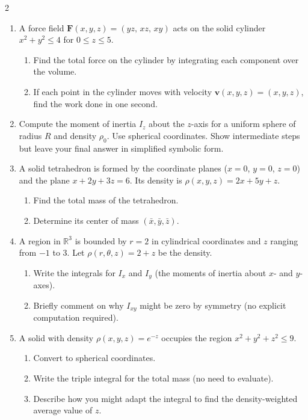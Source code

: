 \begin{multicols}{2}
\begin{enumerate}
\item 
A force field $\mathbf{F}(x,y,z) = (yz,\,xz,\,xy)$ acts on the solid cylinder $x^2+y^2 \le 4$ for $0 \le z \le 5$.  
\begin{enumerate}
   \item Find the total force on the cylinder by integrating each component over the volume.  
   \item If each point in the cylinder moves with velocity $\mathbf{v}(x,y,z)=(x,y,z)$, find the work done in one second.
\end{enumerate}

\item 
Compute the moment of inertia $I_z$ about the $z$-axis for a uniform sphere of radius $R$ and density $\rho_0$. Use spherical coordinates. Show intermediate steps but leave your final answer in simplified symbolic form.

\item 
A solid tetrahedron is formed by the coordinate planes ($x=0$, $y=0$, $z=0$) and the plane $x+2y+3z=6$. Its density is $\rho(x,y,z)=2x+5y+z$.  
\begin{enumerate}
   \item Find the total mass of the tetrahedron.  
   \item Determine its center of mass $(\bar{x},\bar{y},\bar{z})$.
\end{enumerate}

\item 
A region in $\mathbb{R}^3$ is bounded by $r=2$ in cylindrical coordinates and $z$ ranging from $-1$ to $3$. Let $\rho(r,\theta,z) = 2 + z$ be the density.  
\begin{enumerate}
   \item Write the integrals for $I_x$ and $I_y$ (the moments of inertia about $x$- and $y$-axes).  
   \item Briefly comment on why $I_{xy}$ might be zero by symmetry (no explicit computation required).
\end{enumerate}

\item 
A solid with density $\rho(x,y,z)=e^{-z}$ occupies the region $x^2 + y^2 + z^2 \le 9$.  
\begin{enumerate}
   \item Convert to spherical coordinates.  
   \item Write the triple integral for the total mass (no need to evaluate).  
   \item Describe how you might adapt the integral to find the density-weighted average value of $z$.
\end{enumerate}

\end{enumerate}

\end{multicols}


